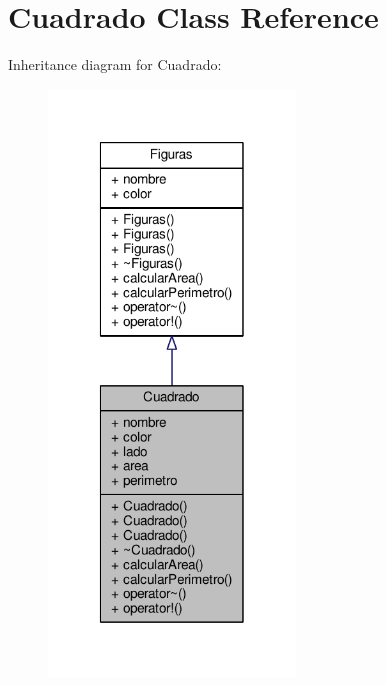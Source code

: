 \hypertarget{class_cuadrado}{}\section{Cuadrado Class Reference}
\label{class_cuadrado}


Inheritance diagram for Cuadrado\+:
\nopagebreak
\begin{figure}[H]
\begin{center}
\leavevmode
\includegraphics[width=186pt]{class_cuadrado__inherit__graph}
\end{center}
\end{figure}


